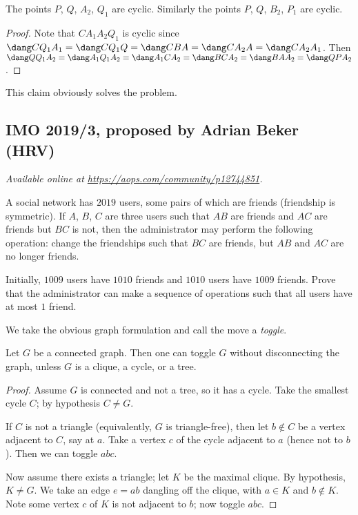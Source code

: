 \documentclass[11pt]{scrartcl}
\begin{document}
\begin{claim*}
  The points $P$, $Q$, $A_2$, $Q_1$ are cyclic.
  Similarly the points $P$, $Q$, $B_2$, $P_1$ are cyclic.
\end{claim*}
\begin{proof}
  Note that $CA_1A_2Q_1$ is cyclic since
  $\dang CQ_1A_1 = \dang CQ_1Q = \dang CBA = \dang CA_2A = \dang CA_2A_1$.
  Then $\dang QQ_1A_2 = \dang A_1Q_1A_2 = \dang A_1 C A_2
  = \dang B C A_2 = \dang B A A_2 = \dang Q P A_2$.
\end{proof}

This claim obviously solves the problem.
\pagebreak

\subsection{IMO 2019/3, proposed by Adrian Beker (HRV)}
\textsl{Available online at \url{https://aops.com/community/p12744851}.}
\begin{mdframed}[style=mdpurplebox,frametitle={Problem statement}]
A social network has $2019$ users,
some pairs of which are friends (friendship is symmetric).
If $A$, $B$, $C$ are three users such that
$AB$ are friends and $AC$ are friends but $BC$ is not,
then the administrator may perform the following operation:
change the friendships such that $BC$ are friends,
but $AB$ and $AC$ are no longer friends.

Initially, $1009$ users have $1010$ friends
and $1010$ users have $1009$ friends.
Prove that the administrator can make a sequence of operations
such that all users have at most $1$ friend.
\end{mdframed}
We take the obvious graph formulation
and call the move a \emph{toggle}.

\begin{claim*}
  Let $G$ be a connected graph.
  Then one can toggle $G$ without disconnecting the graph,
  unless $G$ is a clique, a cycle, or a tree.
\end{claim*}
\begin{proof}
  Assume $G$ is connected and not a tree, so it has a cycle.
  Take the smallest cycle $C$; by hypothesis $C \neq G$.

  If $C$ is not a triangle (equivalently, $G$ is triangle-free),
  then let $b \notin C$ be a vertex adjacent to $C$, say at $a$.
  Take a vertex $c$ of the cycle adjacent to $a$ (hence not to $b$).
  Then we can toggle $abc$.

  Now assume there exists a triangle; let $K$ be the maximal clique.
  By hypothesis, $K \neq G$.
  We take an edge $e = ab$ dangling off the clique,
  with $a \in K$ and $b \notin K$.
  Note some vertex $c$ of $K$ is not adjacent to $b$; now toggle $abc$.
\end{proof}
\end{document}
